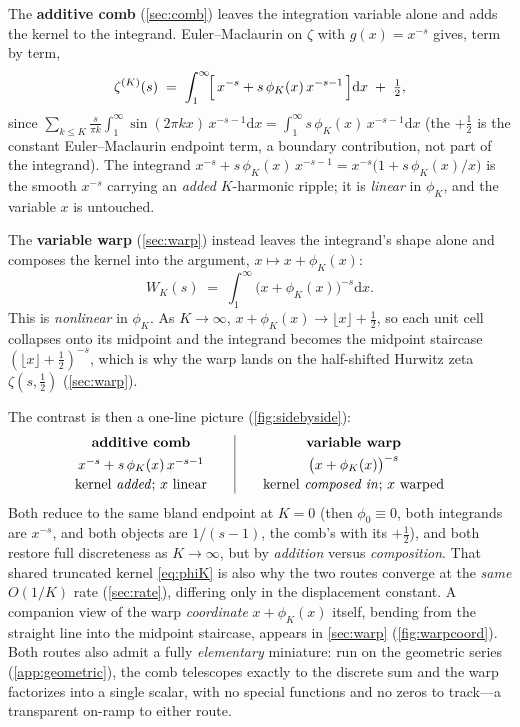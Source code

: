 \documentclass[11pt]{article}
\theoremstyle{definition}
\newcommand{\dd}{\mathrm{d}}
\begin{document}
The \textbf{additive comb} (\cref{sec:comb}) leaves the integration variable alone
and adds the kernel to the integrand. Euler--Maclaurin on $\zeta$ with $g(x)=x^{-s}$
gives, term by term,
\begin{equation}\label{eq:combintegrand}
  \zeta^{(K)}(s)
  \;=\;
  \int_1^\infty\!\Bigl[\,x^{-s} + s\,\phi_K(x)\,x^{-s-1}\,\Bigr]\dd x \;+\; \tfrac12,
\end{equation}
since $\sum_{k\le K}\tfrac{s}{\pi k}\int_1^\infty\!\sin(2\pi k x)\,x^{-s-1}\dd x
= \int_1^\infty\! s\,\phi_K(x)\,x^{-s-1}\dd x$ (the $+\tfrac12$ is the constant
Euler--Maclaurin endpoint term, a boundary contribution, not part of the
integrand). The integrand $x^{-s}+s\,\phi_K(x)\,x^{-s-1}=x^{-s}\bigl(1+s\,\phi_K(x)/x\bigr)$
is the smooth $x^{-s}$ carrying an \emph{added} $K$-harmonic ripple; it is
\emph{linear} in $\phi_K$, and the variable $x$ is untouched.

The \textbf{variable warp} (\cref{sec:warp}) instead leaves the integrand's shape
alone and composes the kernel into the argument, $x\mapsto x+\phi_K(x)$:
\begin{equation}\label{eq:warpintegrand}
  W_K(s) \;=\; \int_1^\infty\!\bigl(x+\phi_K(x)\bigr)^{-s}\dd x .
\end{equation}
This is \emph{nonlinear} in $\phi_K$. As $K\to\infty$, $x+\phi_K(x)\to\lfloor
x\rfloor+\tfrac12$, so each unit cell collapses onto its midpoint and the integrand
becomes the midpoint staircase $(\lfloor x\rfloor+\tfrac12)^{-s}$, which is why the
warp lands on the half-shifted Hurwitz zeta $\zeta(s,\tfrac12)$ (\cref{sec:warp}).

The contrast is then a one-line picture (\cref{fig:sidebyside}):
\begin{equation}\label{eq:contrast}
  \begin{array}{c@{\qquad}|@{\qquad}c}
  \textbf{additive comb} & \textbf{variable warp}\\[2pt]
  x^{-s} + s\,\phi_K(x)\,x^{-s-1} & \bigl(x+\phi_K(x)\bigr)^{-s}\\[2pt]
  \text{kernel \emph{added}; $x$ linear} & \text{kernel \emph{composed in}; $x$ warped}
  \end{array}
\end{equation}
Both reduce to the same bland endpoint at $K=0$ (then $\phi_0\equiv0$, both
integrands are $x^{-s}$, and both objects are $1/(s-1)$, the comb's with its
$+\tfrac12$), and both restore full discreteness as $K\to\infty$, but by
\emph{addition} versus \emph{composition}. That shared truncated kernel
\eqref{eq:phiK} is also why the two routes converge at the \emph{same} $O(1/K)$
rate (\cref{sec:rate}), differing only in the displacement constant. A companion
view of the warp \emph{coordinate} $x+\phi_K(x)$ itself, bending from the straight
line into the midpoint staircase, appears in \cref{sec:warp} (\cref{fig:warpcoord}).
Both routes also admit a fully \emph{elementary} miniature: run on the geometric
series (\cref{app:geometric}), the comb telescopes exactly to the discrete sum and
the warp factorizes into a single scalar, with no special functions and no zeros
to track---a transparent on-ramp to either route.
\end{document}

